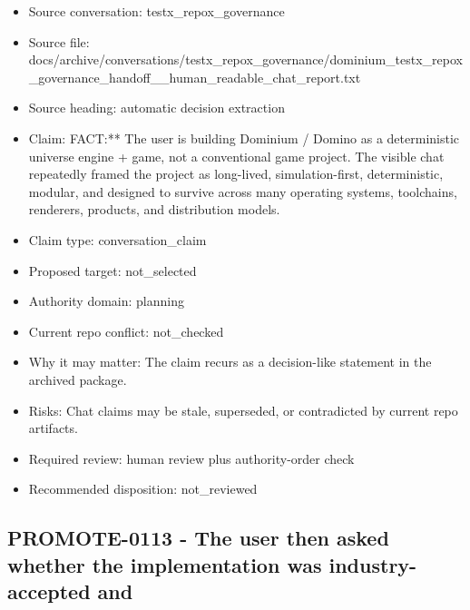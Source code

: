 \documentclass[11pt,a4paper]{report}
\begin{document}
\begin{itemize}
\item Source conversation: testx\_repox\_governance
\item Source file: docs/archive/conversations/testx\_repox\_governance/dominium\_testx\_repox\_governance\_handoff\_\_human\_readable\_chat\_report.txt
\item Source heading: automatic decision extraction
\item Claim: FACT:** The user is building Dominium / Domino as a deterministic universe engine + game, not a conventional game project. The visible chat repeatedly framed the project as long-lived, simulation-first, deterministic, modular, and designed to survive across many operating systems, toolchains, renderers, products, and distribution models.
\item Claim type: conversation\_claim
\item Proposed target: not\_selected
\item Authority domain: planning
\item Current repo conflict: not\_checked
\item Why it may matter: The claim recurs as a decision-like statement in the archived package.
\item Risks: Chat claims may be stale, superseded, or contradicted by current repo artifacts.
\item Required review: human review plus authority-order check
\item Recommended disposition: not\_reviewed
\end{itemize}

\subsection{PROMOTE-0113 - The user then asked whether the implementation was industry-accepted and}
\end{document}
